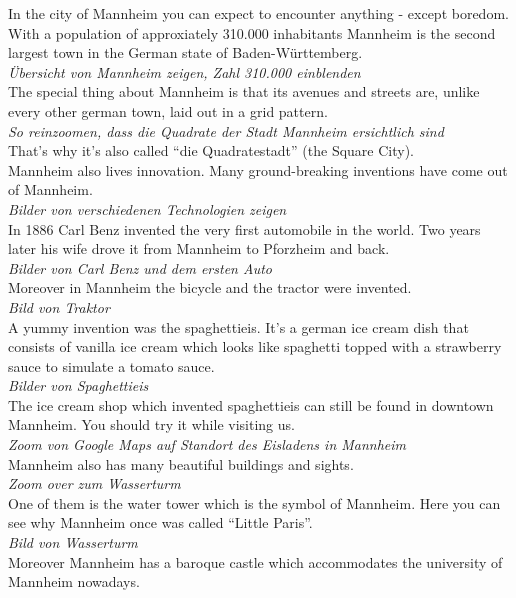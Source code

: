 In the city of Mannheim you can expect to encounter anything - except boredom.\\
With a population of approxiately 310.000 inhabitants Mannheim is the second largest town in the German state of Baden-Württemberg.\\
\textit{Übersicht von Mannheim zeigen, Zahl 310.000 einblenden}\\
The special thing about Mannheim is that its avenues and streets are, unlike every other german town, laid out in a grid pattern.\\
\textit{So reinzoomen, dass die Quadrate der Stadt Mannheim ersichtlich sind}\\
That’s why it’s also called “die Quadratestadt” (the Square City).\\
Mannheim also lives innovation. Many ground-breaking inventions have come out of Mannheim.\\
\textit{Bilder von verschiedenen Technologien zeigen}\\ 
In 1886 Carl Benz invented the very first automobile in the world. Two years later his wife drove it from Mannheim to Pforzheim and back.\\
\textit{Bilder von Carl Benz und dem ersten Auto}\\
Moreover in Mannheim the bicycle and the tractor were invented.\\
\textit{Bild von Traktor}\\
A yummy invention was the spaghettieis. It’s a german ice cream dish that consists of vanilla ice cream which looks like spaghetti topped with a strawberry sauce to simulate a tomato sauce.\\
\textit{Bilder von Spaghettieis}\\
The ice cream shop which invented spaghettieis can still be found in downtown Mannheim. You should try it while visiting us.\\
\textit{Zoom von Google Maps auf Standort des Eisladens in Mannheim}\\
Mannheim also has many beautiful buildings and sights.\\
\textit{Zoom over zum Wasserturm}\\
One of them is the water tower which is the symbol of Mannheim. 
Here you can see why Mannheim once was called “Little Paris”.\\
\textit{Bild von Wasserturm}\\
Moreover Mannheim has a baroque castle which accommodates the university of Mannheim nowadays.\\
